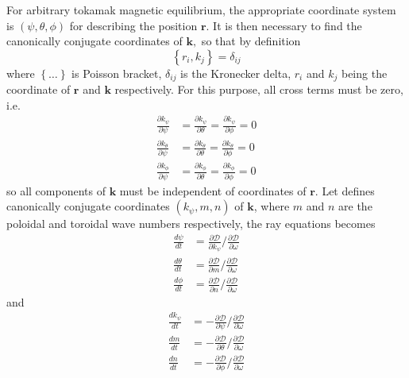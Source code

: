 \documentclass[a4paper,12pt]{article}%
\begin{document}
For arbitrary tokamak magnetic equilibrium, the appropriate coordinate system
is $\left(  \psi,\theta,\phi\right)  $ for describing the position
$\mathbf{r.}$ It is then necessary to find the canonically conjugate
coordinates of $\mathbf{k,}$ so that by definition%
\begin{equation}
\left\{  r_{i},k_{j}\right\}  =\delta_{ij}%
\end{equation}
where $\left\{  \ldots\right\}  $ is Poisson bracket, $\delta_{ij}$ is the
Kronecker delta, $r_{i}$ and $k_{j}$ being the coordinate of $\mathbf{r}$ and
$\mathbf{k}$ respectively. For this purpose, all cross terms must be zero,
i.e.%
\begin{align}
\frac{\partial k_{\psi}}{\partial\psi}  &  =\frac{\partial k_{\psi}}%
{\partial\theta}=\frac{\partial k_{\psi}}{\partial\phi}=0\\
\frac{\partial k_{\theta}}{\partial\psi}  &  =\frac{\partial k_{\theta}%
}{\partial\theta}=\frac{\partial k_{\theta}}{\partial\phi}=0\\
\frac{\partial k_{\phi}}{\partial\psi}  &  =\frac{\partial k_{\phi}}%
{\partial\theta}=\frac{\partial k_{\phi}}{\partial\phi}=0
\end{align}
so all components of $\mathbf{k}$ must be independent of coordinates of
$\mathbf{r.}$ Let defines canonically conjugate coordinates $\left(  k_{\psi
},m,n\right)  $ of $\mathbf{k}$, where $m$ and $n$ are the poloidal and
toroidal wave numbers respectively, the ray equations becomes
\begin{align}
\frac{d\psi}{dt}  &  =\frac{\partial\mathcal{D}}{\partial k_{\psi}}%
/\frac{\partial\mathcal{D}}{\partial\omega}\label{h1}\\
\frac{d\theta}{dt}  &  =\frac{\partial\mathcal{D}}{\partial m}/\frac
{\partial\mathcal{D}}{\partial\omega}\label{h2}\\
\frac{d\phi}{dt}  &  =\frac{\partial\mathcal{D}}{\partial n}/\frac
{\partial\mathcal{D}}{\partial\omega} \label{h3}%
\end{align}
and
\begin{align}
\frac{dk_{\psi}}{dt}  &  =-\frac{\partial\mathcal{D}}{\partial\psi}%
/\frac{\partial\mathcal{D}}{\partial\omega}\label{h4}\\
\frac{dm}{dt}  &  =-\frac{\partial\mathcal{D}}{\partial\theta}/\frac
{\partial\mathcal{D}}{\partial\omega}\label{h5}\\
\frac{dn}{dt}  &  =-\frac{\partial\mathcal{D}}{\partial\phi}/\frac
{\partial\mathcal{D}}{\partial\omega} \label{h6}%
\end{align}
\end{document}
